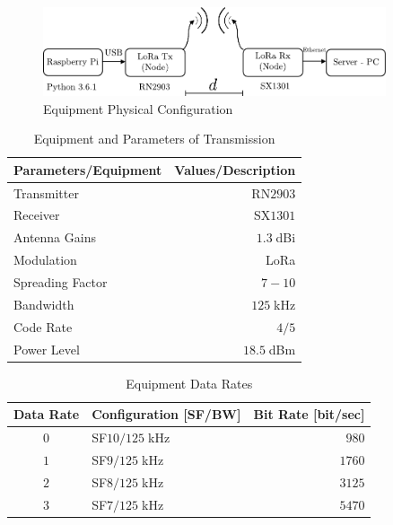 \begin{figure}[h!]
  \centering
  \includegraphics[width=0.9\textwidth]{./figures/Figure2/Figure2.pdf}
  \caption{Equipment Physical Configuration}
  \label{fig:physicalconfig}
\end{figure}


\begin{table}[h!]
  \centering
  \caption{Equipment and Parameters of Transmission \cite{Microchip2016a}}
  \label{tab:EquipmentandParameters}
  \resizebox{8cm}{!} {
    \begin{tabular}{lr}
      \toprule
      \textbf{Parameters/Equipment} & \textbf{Values/Description} \\ 
      \midrule
      Transmitter & RN$2903$\\ 
      Receiver & SX$1301$\\ 
      Antenna Gains & $1.3\;$dBi\\ 
      Modulation & LoRa\\ 
      Spreading Factor & $7-10$\\
      Bandwidth & $125\;$kHz\\ 
      Code Rate & $4/5$\\ 
      Power Level & $18.5\;$dBm\\ 
      \bottomrule
    \end{tabular}
  }
\end{table}


\begin{table}[h!]
  \centering
  \caption{Equipment Data Rates \cite{N.SorninSemtechM.LuisSemtechT.EirichIBMT.KrampIBM2015}}
  \label{tab:datarates}
  \resizebox{9cm}{!} {
    \begin{tabular}{clr}
      \toprule
      \multicolumn{1}{l}{\textbf{Data Rate}} & \textbf{Configuration {[}SF/BW{]}} & \multicolumn{1}{l}{\textbf{Bit Rate {[}bit/sec{]}}} \\
      \midrule
      $0$                             & SF$10 / 125\;$kHz            & $980$                                        \\
      $1$                             & SF$9 / 125\;$kHz             & $1760$                                       \\
      $2$                             & SF$8 / 125\;$kHz             & $3125$                                       \\
      $3$                             & SF$7 / 125\;$kHz             & $5470$                                     \\
      \bottomrule
    \end{tabular}
  }
\end{table}


